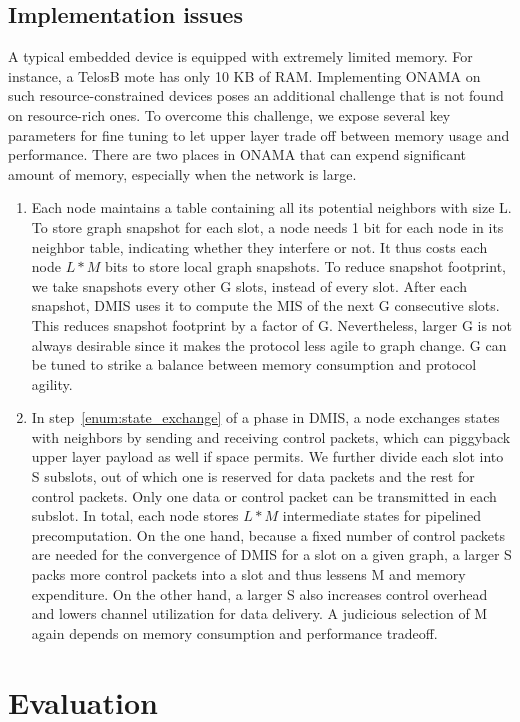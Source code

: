 \documentclass[conference]{IEEEtran}
\begin{document}
\subsection{Implementation issues}	\label{subsection:impl}
A typical embedded device is equipped with extremely limited memory. For instance, a TelosB \cite{telosb} mote has only 10 KB of RAM. Implementing ONAMA on such resource-constrained devices poses an additional challenge that is not found on resource-rich ones. To overcome this challenge, we expose several key parameters for fine tuning to let upper layer trade off between memory usage and performance. There are two places in ONAMA that can expend significant amount of memory, especially when the network is large.
\begin{enumerate}
\item
Each node maintains a table containing all its potential neighbors with size L. To store graph snapshot for each slot, a node needs 1 bit for each node in its neighbor table, indicating whether they interfere or not. It thus costs each node $L * M$ bits to store local graph snapshots. To reduce snapshot footprint, we take snapshots every other G slots, instead of every slot. After each snapshot, DMIS uses it to compute the MIS of the next G consecutive slots. This reduces snapshot footprint by a factor of G. Nevertheless, larger G is not always desirable since it  makes the protocol less agile to graph change. G can be tuned to strike a balance between memory consumption and protocol agility.

\item
In step~\ref{enum:state_exchange} of a phase in DMIS, a node exchanges states with neighbors by sending and receiving control packets, which can piggyback upper layer payload as well if space permits. We further divide each slot into S subslots, out of which one is reserved for data packets and the rest for control packets. Only one data or control packet can be transmitted in each subslot. In total, each node stores $L * M$ intermediate states for pipelined precomputation. On the one hand, because a fixed number of control packets are needed for the convergence of DMIS for a slot on a given graph,  a larger S packs more control packets into a slot and thus lessens M and memory expenditure. On the other hand, a larger S also increases control overhead and lowers channel utilization for data delivery. A judicious selection of M again depends on memory consumption and performance tradeoff.
\end{enumerate}
 \section{Evaluation} \label{section:evaluation}
\end{document}
